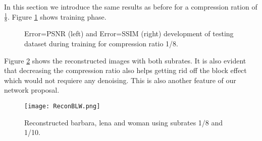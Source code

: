In this section we introduce the same results as before for a compression ration of $\frac{1}{8}$. Figure \ref{fig:trainTestsub1-8} shows training phase. 

\begin{figure}[!htb] 
\centering 
{} 
\caption[PSNR and SSIM traning for compression ratio 1/8.]{\color{red}Error=PSNR \color{black}(left) and \color{red}Error=SSIM \color{black}(right) development of testing dataset during training for compression ratio 1/8.}
\label{fig:trainTestsub1-8}
\end{figure}

\FloatBarrier

Figure \ref{fig:ReconBLW} shows the reconstructed images with both subrates. It is also evident that decreasing the compression ratio also helps getting rid off the block effect which would not requiere any denoising. This is also another feature of our network proposal.  

\begin{figure}[!htb] 
\centering 
\texttt{[image: ReconBLW.png]}
\caption{Reconstructed barbara, lena and woman using subrates 1/8 and 1/10.}
\label{fig:ReconBLW} 
\end{figure}


